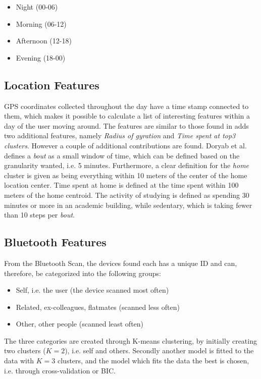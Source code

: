\begin{itemize}
\item Night (00-06)
\item Morning (06-12)
\item Afternoon (12-18)
\item Evening (18-00)
\end{itemize}

\subsection{Location Features}
GPS coordinates collected throughout the day have a time stamp connected to them, which makes it possible to calculate a list of interesting features within a day of the user moving around. The features are similar to those found in \cite{Saeb2015} adds two additional features, namely \textit{Radius of gyration} and \textit{Time spent at top3 clusters}. However a couple of additional contributions are found. Doryab et al. defines a \textit{bout} as a small window of time, which can be defined based on the granularity wanted, i.e. 5 minutes. Furthermore, a clear definition for the \textit{home} cluster is given as being everything within 10 meters of the center of the home location center. Time spent at home is defined at the time spent within 100 meters of the home centroid. The activity of studying is defined as spending 30 minutes or more in an academic building, while sedentary, which is taking fewer than 10 steps per \textit{bout}.

\subsection{Bluetooth Features}
From the Bluetooth Scan, the devices found each has a unique ID and can, therefore, be categorized into the following groups:

\begin{itemize}
    \item Self, i.e. the user (the device scanned most often)
    \item Related, ex-colleagues, flatmates (scanned less often)
    \item Other, other people (scanned least often)
\end{itemize}

The three categories are created through K-means clustering, by initially creating two clusters ($K=2$), i.e. self and others. Secondly another model is fitted to the data with $K=3$ clusters, and the model which fits the data the best is chosen, i.e. through cross-validation or BIC.


